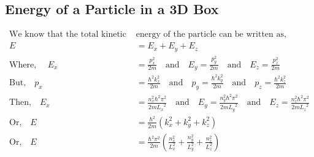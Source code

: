   \subsection{Energy of a Particle in a 3D Box}
  $$
  \begin{aligned}
  \text{We know that the total kinetic  }&\text{energy of the particle can be written as,}\\
  \left. \right. E&=E_{x}+E_{y}+E_{z}\\
  \text{Where, } \quad  E_{x}&= \frac{p_{x}^{2}}{2m} \quad \text{and} \quad E_{y}= \frac{p_{y}^{2}}{2m}\quad \text{and} \quad E_{z}= \frac{p_{z}^{2}}{2m}\\
  \text{But,} \quad  p_{x}&= \frac{\hbar^{2} k_{x}^{2}}{2m} \quad \text{and}\quad  p_{y}= \frac{\hbar^{2} k_{y}^{2}}{2m}\quad \text{and}\quad  p_{z}= \frac{\hbar^{2} k_{z}^{2}}{2m}\\
  \text{Then,} \quad  E_{x}&=\frac{{ n_{x}^{2}\hbar^{2}} {\pi}^{2}}{2m {L_{x}}^{2}} \quad \text{and}\quad E_{y}=\frac{{ n_{y}^{2}\hbar^{2}} {\pi}^{2}}{2m {L_{y}}^{2}} \quad \text{and}\quad E_{z}=\frac{{ n_{z}^{2}\hbar^{2}} {\pi}^{2}}{2m {L_{z}}^{2}}\\
  \text{Or,} \quad E&=  \frac{\hbar^{2}}{2m}\left(  k_{x}^{2}+k_{y}^{2}+k_{z}^{2}\right) \\
  \text{Or,}\quad E&= \frac{\hbar^{2} \pi^{2}}{2m}\left(  \frac{n_{x}^{2}}{L_{x}^{2}}+ \frac{n_{y}^{2}}{L_{y}^{2}}+\frac{n_{z}^{2}}{L_{z}^{2}}\right)
  \end{aligned}
$$
  \begin{center}
  \end{center}
